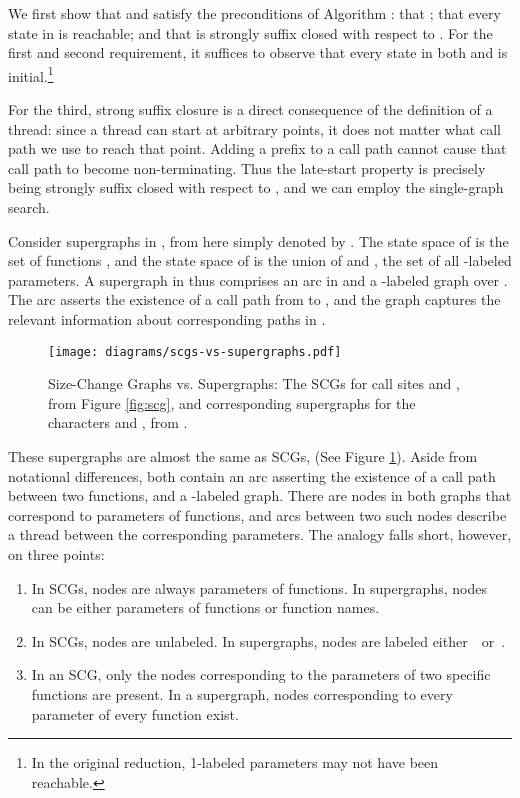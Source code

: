 \documentclass{LMCS}
\begin{document}
We first show that  and  satisfy the preconditions 
of Algorithm \linebreak[4]\SGS: that ; that every state in
 is reachable; and that  is strongly suffix closed with respect
to .  For the first and second requirement, it suffices to observe that
every state in both  and  is initial.\footnote{In
the original reduction, 1-labeled parameters may not have been reachable.} 

For the third, strong suffix closure is a direct consequence of the definition
of a thread: since a thread can start at arbitrary points, it does not matter
what call path we use to reach that point. Adding a prefix to a call path cannot
cause that call path to become non-terminating. Thus the late-start property is
precisely  being strongly suffix closed with respect to , and
we can employ the single-graph search. 

Consider supergraphs in , from here
simply denoted by .  The state space of  is the set
of functions , and the state space of  is the union of  and
, the set of all -labeled parameters.  A supergraph in
 thus comprises an arc  in
 and a -labeled graph  over . The arc asserts
the existence of a call path from  to , and the graph  captures
the relevant information about corresponding paths in . 

\begin{figure}[tb]
\begin{center}
{\texttt{[image: diagrams/scgs-vs-supergraphs.pdf]}}
\end{center}
\caption{Size-Change Graphs vs. Supergraphs: The SCGs for call sites  and , from Figure \ref{fig:scg}, and corresponding
supergraphs for the characters  and , from .}\label{fig:scg_vs_supergraphs}
\end{figure}

These supergraphs are almost the same as SCGs,  (See Figure
\ref{fig:scg_vs_supergraphs}).  Aside from notational differences, both contain an arc asserting the
existence of a call path between two functions, and a -labeled graph.  There are nodes in
both graphs that correspond to parameters of functions,
and arcs between two such nodes describe a thread between the corresponding
parameters. The analogy falls short, however, on three points:
\begin{enumerate}[(1)]
\item\label{Dif:FNames} In SCGs, nodes are always parameters of
functions.  In supergraphs, nodes can be either parameters of functions or
function names. 
\item\label{Dif:Labels} In SCGs, nodes are unlabeled. In
supergraphs, nodes are labeled either~~or~. 
\item\label{Dif:Width} In an SCG, only the nodes corresponding to
the parameters of two specific functions are present. In a supergraph, nodes 
corresponding to every parameter of every function exist. 
\end{enumerate}
\end{document}
